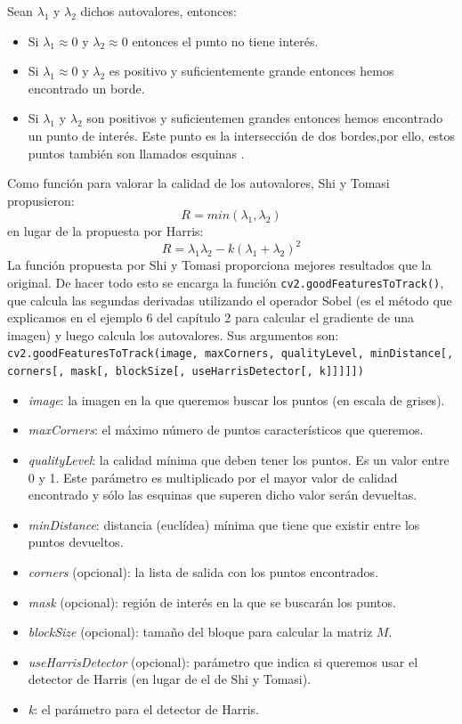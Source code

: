 \documentclass[a4paper,openright, 12pt]{book}
\begin{document}
Sean $\lambda_1$ y $\lambda_2$ dichos autovalores, entonces:
\begin{itemize}
\item Si  $ \lambda_1 \approx 0 $ y $\lambda_2 \approx 0 $ entonces el punto no tiene interés.
\item Si  $ \lambda_1 \approx 0 $ y $\lambda_2 $ es positivo y suficientemente grande entonces hemos encontrado un borde.
\item Si  $ \lambda_1 $ y $\lambda_2 $ son positivos y suficientemen grandes entonces hemos encontrado un punto de interés. Este punto es la intersección de dos bordes,por ello, estos puntos también son llamados esquinas .
\end{itemize}
Como función para valorar la calidad de los autovalores, Shi y Tomasi \cite{shiandtomasi} propusieron:
\begin{equation*}
R = min(\lambda_1, \lambda_2)
\end{equation*}
en lugar de la propuesta por Harris:
\begin{equation*}
R = \lambda_1 \lambda_2 - k(\lambda_1 + \lambda_2)^2
\end{equation*}
La función propuesta por Shi y Tomasi proporciona mejores resultados que la original.
De hacer todo esto se encarga la función \lstinline|cv2.goodFeaturesToTrack()|, que calcula las segundas derivadas utilizando el operador Sobel (es el método que explicamos en el ejemplo 6 del capítulo 2 para calcular el gradiente de una imagen) y luego calcula los autovalores.
Sus argumentos son:
\newline
\lstinline|cv2.goodFeaturesToTrack(image, maxCorners, qualityLevel, minDistance[, corners[, mask[, blockSize[, useHarrisDetector[, k]]]]]) |
\begin{itemize}
\item \textit{image}: la imagen en la que queremos buscar los puntos (en escala de grises).
\item \textit{maxCorners}:  el máximo número de puntos característicos que queremos.
\item \textit{qualityLevel}: la calidad mínima que deben tener los puntos. Es un valor entre 0 y 1. Este parámetro es multiplicado por el mayor valor de calidad encontrado y sólo las esquinas que superen dicho valor serán devueltas.
\item \textit{minDistance}: distancia (euclídea) mínima que tiene que existir entre los puntos devueltos.
\item \textit{corners} (opcional): la lista de salida con los puntos encontrados.
\item \textit{mask} (opcional): región de interés en la que se buscarán los puntos.
\item \textit{blockSize} (opcional): tamaño del bloque para calcular la matriz $M$.
\item \textit{useHarrisDetector} (opcional): parámetro que indica si queremos usar el detector de Harris (en lugar de el de Shi y Tomasi).
\item \textit{k}: el parámetro para el detector de Harris.
\end{itemize}
\end{document}
